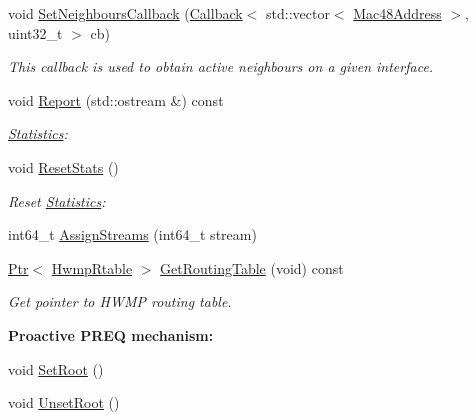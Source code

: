 \begin{DoxyCompactItemize}
\item 
void \hyperlink{classns3_1_1dot11s_1_1HwmpProtocol_ad73763e123f517bff350e0fef9f94290}{Set\+Neighbours\+Callback} (\hyperlink{classns3_1_1Callback}{Callback}$<$ std\+::vector$<$ \hyperlink{classns3_1_1Mac48Address}{Mac48\+Address} $>$, uint32\+\_\+t $>$ cb)
\begin{DoxyCompactList}\small\item\em This callback is used to obtain active neighbours on a given interface. \end{DoxyCompactList}\item 
void \hyperlink{classns3_1_1dot11s_1_1HwmpProtocol_ad48a354645b733b83f8655c0a20f1c16}{Report} (std\+::ostream \&) const 
\begin{DoxyCompactList}\small\item\em \hyperlink{structns3_1_1dot11s_1_1HwmpProtocol_1_1Statistics}{Statistics}\+: \end{DoxyCompactList}\item 
void \hyperlink{classns3_1_1dot11s_1_1HwmpProtocol_aec9d892c9c97deb3e4b08ce28df0d5a2}{Reset\+Stats} ()
\begin{DoxyCompactList}\small\item\em Reset \hyperlink{structns3_1_1dot11s_1_1HwmpProtocol_1_1Statistics}{Statistics}\+: \end{DoxyCompactList}\item 
int64\+\_\+t \hyperlink{classns3_1_1dot11s_1_1HwmpProtocol_a62f0629ddbc028a90ec46909a2a5c572}{Assign\+Streams} (int64\+\_\+t stream)
\item 
\hyperlink{classns3_1_1Ptr}{Ptr}$<$ \hyperlink{classns3_1_1dot11s_1_1HwmpRtable}{Hwmp\+Rtable} $>$ \hyperlink{classns3_1_1dot11s_1_1HwmpProtocol_ac9daf55855776e42294ae5cf04e99851}{Get\+Routing\+Table} (void) const 
\begin{DoxyCompactList}\small\item\em Get pointer to H\+W\+MP routing table. \end{DoxyCompactList}\end{DoxyCompactItemize}
\begin{Indent}{\bf Proactive P\+R\+EQ mechanism\+:}\par
\begin{DoxyCompactItemize}
\item 
void \hyperlink{classns3_1_1dot11s_1_1HwmpProtocol_a04231db1d3a7f11ef1bd87b96887d6c4}{Set\+Root} ()
\item 
void \hyperlink{classns3_1_1dot11s_1_1HwmpProtocol_a3473513c5a6fad0630c0a2de2623c49e}{Unset\+Root} ()
\end{DoxyCompactItemize}
\end{Indent}
